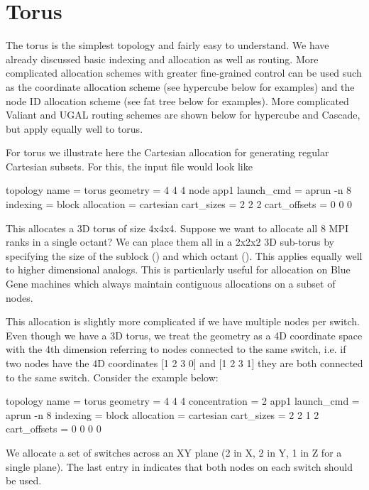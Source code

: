 \section{Torus}
\label{subsec:tutorial:hypercube}

The torus is the simplest topology and fairly easy to understand.
We have already discussed basic indexing and allocation as well as routing.
More complicated allocation schemes with greater fine-grained control can be used such as the
coordinate allocation scheme (see hypercube below for examples) and the node ID allocation scheme (see fat tree below for examples).
More complicated Valiant and UGAL routing schemes are shown below for hypercube and Cascade,
but apply equally well to torus.

For torus we illustrate here the Cartesian allocation for generating regular Cartesian subsets.
For this, the input file would look like 

\begin{ViFile}
topology {
 name = torus
 geometry = 4 4 4
}
node {
 app1 {
  launch_cmd = aprun -n 8
  indexing = block
  allocation = cartesian
  cart_sizes = 2 2 2
  cart_offsets = 0 0 0
 }
}
\end{ViFile}

This allocates a 3D torus of size 4x4x4.
Suppose we want to allocate all 8 MPI ranks in a single octant?
We can place them all in a 2x2x2 3D sub-torus by specifying the size of the sublock 
() and which octant ().
This applies equally well to higher dimensional analogs.
This is particularly useful for allocation on Blue Gene machines
which always maintain contiguous allocations on a subset of nodes.

This allocation is slightly more complicated if we have multiple nodes per switch.
Even though we have a 3D torus, 
we treat the geometry as a 4D coordinate space with the 4th dimension referring to nodes connected to the same switch, 
i.e. if two nodes have the 4D coordinates [1 2 3 0] and [1 2 3 1] they are both connected to the same switch.
Consider the example below:

\begin{ViFile}
topology {
 name = torus
 geometry = 4 4 4
 concentration = 2
}
app1 {
 launch_cmd = aprun -n 8
 indexing = block
 allocation = cartesian
 cart_sizes = 2 2 1 2
 cart_offsets = 0 0 0 0
}
\end{ViFile}

We allocate a set of switches across an XY plane (2 in X, 2 in Y, 1 in Z for a single plane).
The last entry in  indicates that both nodes on each switch should be used.


